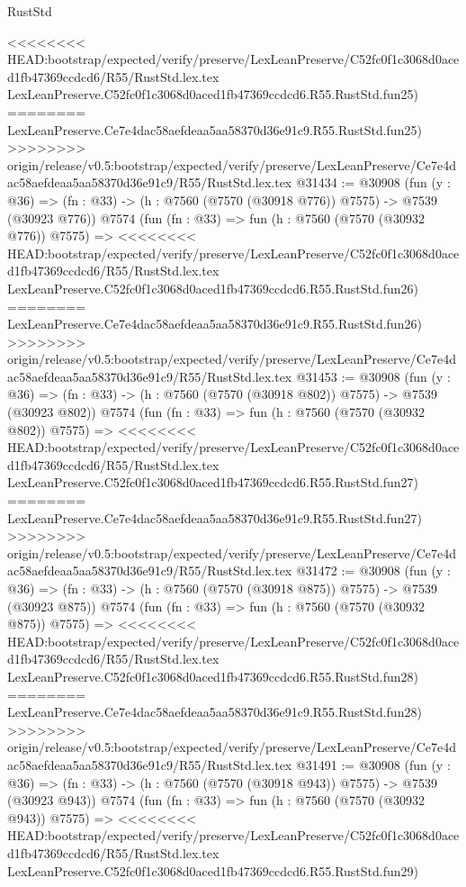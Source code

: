 \begin{lexlean}{RustStd}
\begin{coremodule}
{\begin{coremodule}
{{{{{{{{{{{{{{{{{{{{{{{{{{{{{{{{{{{{{{{{{{{<<<<<<<< HEAD:bootstrap/expected/verify/preserve/LexLeanPreserve/C52fc0f1c3068d0aced1fb47369ccdcd6/R55/RustStd.lex.tex
    LexLeanPreserve.C52fc0f1c3068d0aced1fb47369ccdcd6.R55.RustStd.fun25)
========
    LexLeanPreserve.Ce7e4dac58aefdeaa5aa58370d36e91c9.R55.RustStd.fun25)
>>>>>>>> origin/release/v0.5:bootstrap/expected/verify/preserve/LexLeanPreserve/Ce7e4dac58aefdeaa5aa58370d36e91c9/R55/RustStd.lex.tex
@31434 := @30908
    (fun (y : @36) => (fn : @33) -> (h : @7560 (@7570 (@30918 @776)) @7575) -> @7539 (@30923 @776))
    @7574
    (fun (fn : @33) =>
    fun (h : @7560 (@7570 (@30932 @776)) @7575) =>
<<<<<<<< HEAD:bootstrap/expected/verify/preserve/LexLeanPreserve/C52fc0f1c3068d0aced1fb47369ccdcd6/R55/RustStd.lex.tex
    LexLeanPreserve.C52fc0f1c3068d0aced1fb47369ccdcd6.R55.RustStd.fun26)
========
    LexLeanPreserve.Ce7e4dac58aefdeaa5aa58370d36e91c9.R55.RustStd.fun26)
>>>>>>>> origin/release/v0.5:bootstrap/expected/verify/preserve/LexLeanPreserve/Ce7e4dac58aefdeaa5aa58370d36e91c9/R55/RustStd.lex.tex
@31453 := @30908
    (fun (y : @36) => (fn : @33) -> (h : @7560 (@7570 (@30918 @802)) @7575) -> @7539 (@30923 @802))
    @7574
    (fun (fn : @33) =>
    fun (h : @7560 (@7570 (@30932 @802)) @7575) =>
<<<<<<<< HEAD:bootstrap/expected/verify/preserve/LexLeanPreserve/C52fc0f1c3068d0aced1fb47369ccdcd6/R55/RustStd.lex.tex
    LexLeanPreserve.C52fc0f1c3068d0aced1fb47369ccdcd6.R55.RustStd.fun27)
========
    LexLeanPreserve.Ce7e4dac58aefdeaa5aa58370d36e91c9.R55.RustStd.fun27)
>>>>>>>> origin/release/v0.5:bootstrap/expected/verify/preserve/LexLeanPreserve/Ce7e4dac58aefdeaa5aa58370d36e91c9/R55/RustStd.lex.tex
@31472 := @30908
    (fun (y : @36) => (fn : @33) -> (h : @7560 (@7570 (@30918 @875)) @7575) -> @7539 (@30923 @875))
    @7574
    (fun (fn : @33) =>
    fun (h : @7560 (@7570 (@30932 @875)) @7575) =>
<<<<<<<< HEAD:bootstrap/expected/verify/preserve/LexLeanPreserve/C52fc0f1c3068d0aced1fb47369ccdcd6/R55/RustStd.lex.tex
    LexLeanPreserve.C52fc0f1c3068d0aced1fb47369ccdcd6.R55.RustStd.fun28)
========
    LexLeanPreserve.Ce7e4dac58aefdeaa5aa58370d36e91c9.R55.RustStd.fun28)
>>>>>>>> origin/release/v0.5:bootstrap/expected/verify/preserve/LexLeanPreserve/Ce7e4dac58aefdeaa5aa58370d36e91c9/R55/RustStd.lex.tex
@31491 := @30908
    (fun (y : @36) => (fn : @33) -> (h : @7560 (@7570 (@30918 @943)) @7575) -> @7539 (@30923 @943))
    @7574
    (fun (fn : @33) =>
    fun (h : @7560 (@7570 (@30932 @943)) @7575) =>
<<<<<<<< HEAD:bootstrap/expected/verify/preserve/LexLeanPreserve/C52fc0f1c3068d0aced1fb47369ccdcd6/R55/RustStd.lex.tex
    LexLeanPreserve.C52fc0f1c3068d0aced1fb47369ccdcd6.R55.RustStd.fun29)
}}}}}}}}}}}}}}}}}}}}}}}}}}}}}}}}}}}}}}}}}}}
\end{coremodule}}
\end{coremodule}
\end{lexlean}
